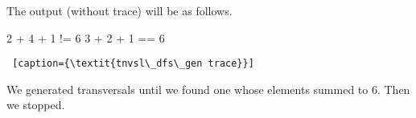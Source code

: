 The output (without trace) will be as follows.
\begin{center}
\begin{minipage}[c]{0.45\textwidth}
\begin{python1}  
    2 + 4 + 1 != 6
    3 + 2 + 1 == 6
\end{python1}\linv
\begin{lstlisting} [caption={\textit{tnvsl\_dfs\_gen trace}}]
\end{lstlisting}
\end{minipage}
\end{center}
We generated transversals until we found one whose elements summed to 6. Then we stopped.





